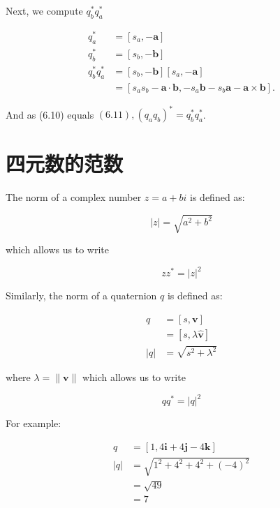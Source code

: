 Next, we compute $q_{b}^{*} q_{a}^{*}$

$$
    \begin{aligned}
        q_{a}^{*}           & =\left[s_{a},-\mathbf{a}\right]                                                                                         \\
        q_{b}^{*}           & =\left[s_{b},-\mathbf{b}\right]                                                                                         \\
        q_{b}^{*} q_{a}^{*} & =\left[s_{b},-\mathbf{b}\right]\left[s_{a},-\mathbf{a}\right]                                                           \\
                            & =\left[s_{a} s_{b}-\mathbf{a} \cdot \mathbf{b},-s_{a} \mathbf{b}-s_{b} \mathbf{a}-\mathbf{a} \times \mathbf{b}\right] .
    \end{aligned}
$$

And as (6.10) equals $(6.11),\left(q_{a} q_{b}\right)^{*}=q_{b}^{*} q_{a}^{*}$.

\section{四元数的范数}
The norm of a complex number $z=a+b i$ is defined as:

$$
    |z|=\sqrt{a^{2}+b^{2}}
$$

which allows us to write

$$
    z z^{*}=|z|^{2}
$$

Similarly, the norm of a quaternion $q$ is defined as:

$$
    \begin{aligned}
        q   & =[s, \mathbf{v}]               \\
            & =[s, \lambda \hat{\mathbf{v}}] \\
        |q| & =\sqrt{s^{2}+\lambda^{2}}
    \end{aligned}
$$

where $\lambda=\|\mathbf{v}\|$ which allows us to write

$$
    q q^{*}=|q|^{2}
$$

For example:

$$
    \begin{aligned}
        q   & =[1,4 \mathbf{i}+4 \mathbf{j}-4 \mathbf{k}] \\
        |q| & =\sqrt{1^{2}+4^{2}+4^{2}+(-4)^{2}}          \\
            & =\sqrt{49}                                  \\
            & =7
    \end{aligned}
$$

